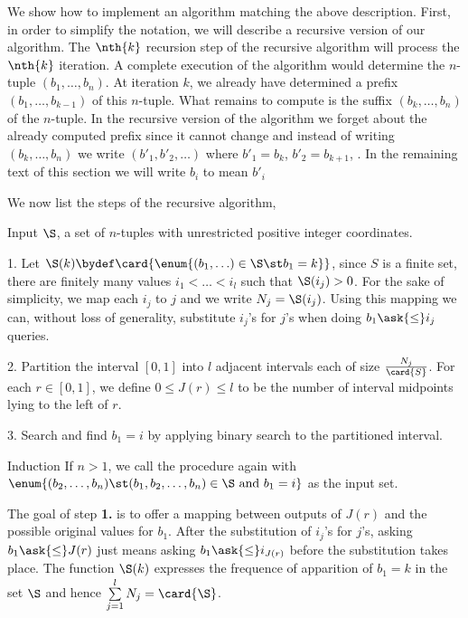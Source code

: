 We show how to implement an algorithm matching the above description. First, in
order to simplify the notation, we will describe a recursive version of our
algorithm. The $\nth{k}$ recursion step of the recursive algorithm will process
the $\nth{k}$ iteration. A complete execution of the algorithm would determine
the $n$-tuple $(b_1, \ldots, b_n)$.  At iteration $k$, we already have
determined a prefix $(b_1, \ldots, b_{k-1})$ of this $n$-tuple. What remains to
compute is the suffix $(b_k, \ldots, b_n)$ of the $n$-tuple. In the recursive
version of the algorithm we forget about the already computed prefix since it
cannot change and instead of writing $(b_k, \ldots, b_n)$ we write $(b'_1,
b'_2, \ldots)$ where $b'_1 = b_k$, $b'_2 = b_{k+1}$, \etc. In the remaining
text of this section we will write $b_i$ to mean $b'_i$

We now list the steps of the recursive algorithm,

\begin{algorithm}

\item[Input] $\S$, a set of $n$-tuples with unrestricted positive integer
coordinates.

\item[1.] Let $\S(k) \bydef \card{\enum{(b_1, \ldots) \in \S \st b_1 = k}}$,
since $S$ is a finite set, there are finitely many values $i_1 < \ldots < i_l$
such that $\S(i_j) > 0$. For the sake of simplicity, we map each $i_j$ to $j$
and we write $N_j = \S(i_j)$. Using this mapping we can, without loss of
generality, substitute $i_j$'s for $j$'s when doing $b_1 \ask{\le} i_j$
queries.

\item[2.] Partition the interval $[0,1]$ into $l$ adjacent intervals each of
size $\frac{N_j}{\card{S}}$. For each $r \in [0,1]$, we define $0 \le J(r) \le
l$ to be the number of interval midpoints lying to the left of $r$.

\item[3.] Search and find $b_1 = i$ by applying binary search to the partitioned
interval.

\item[Induction] If $n > 1$, we call the procedure again with\\
$\enum{(b_2, \ldots, b_n) \st (b_1, b_2, \ldots, b_n) \in \S \text{ and } b_1 =
i}$ as the input set.

\end{algorithm}

The goal of step \textbf{1.} is to offer a mapping between outputs of $J(r)$
and the possible original values for $b_1$. After the substitution of $i_j$'s
for $j$'s, asking $b_1 \ask{\le} J(r)$ just means asking $b_1 \ask{\le}
i_{J(r)}$ before the substitution takes place. The function $\S(k)$ expresses
the frequence of apparition of $b_1 = k$ in the set $\S$ and hence
$\sum\limits_{j=1}^{l} N_j = \card{\S}$.

